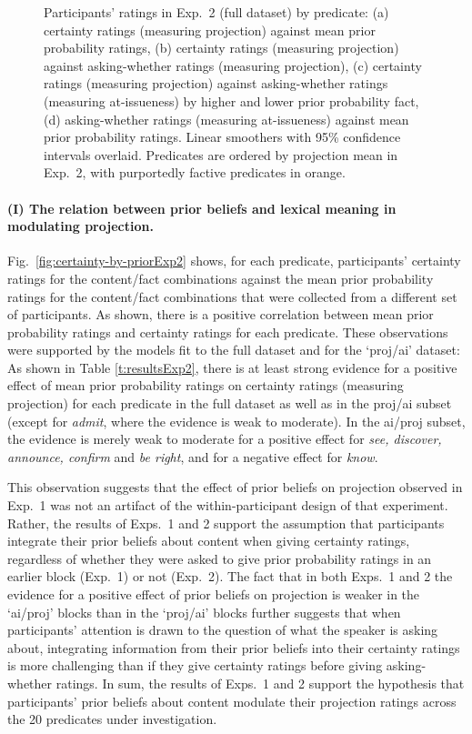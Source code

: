 \documentclass[11pt,fleqn]{article}
\newcommand{\6}{\mbox{$[\hspace*{-.6mm}[$}}
\newcommand{\9}{\mbox{$]\hspace*{-.6mm}]$}}
\begin{document}
\begin{figure}[h!]
\caption{Participants' ratings in Exp.~2 (full dataset) by predicate: (a) certainty ratings (measuring projection) against mean prior probability ratings, (b) certainty ratings (measuring projection) against asking-whether ratings (measuring projection), (c) certainty ratings (measuring projection) against asking-whether ratings (measuring at-issueness) by higher and lower prior probability fact, (d) asking-whether ratings (measuring at-issueness) against mean prior probability ratings. Linear smoothers with 95\% confidence intervals overlaid. Predicates are ordered by projection mean in Exp.~2, with purportedly factive predicates in orange.}\label{fig:results2}
\end{figure}

\paragraph{(I) The relation between prior beliefs and lexical meaning in modulating projection.}  Fig.~\ref{fig:certainty-by-priorExp2} shows, for each predicate, participants' certainty ratings for the content/fact combinations against the mean prior probability ratings for the content/fact combinations that were collected from a different set of participants. As shown, there is a positive correlation between mean prior probability ratings and certainty ratings for each predicate. These observations were supported by the models fit to the full dataset and for the `proj/ai' dataset: As shown in Table \ref{t:resultsExp2}, there is at least strong evidence for a positive effect of mean prior probability ratings on certainty ratings (measuring projection) for each predicate in the full dataset as well as in the proj/ai subset (except for {\em admit}, where the evidence is weak to moderate). In the ai/proj subset, the evidence is merely weak to moderate for a positive effect for {\em see, discover, announce, confirm} and {\em be right}, and for a negative effect for {\em know}. 

 This observation suggests that the effect of prior beliefs on projection observed in Exp.~1 was not an artifact of the within-participant design of that experiment. Rather, the results of Exps.~1 and 2 support the assumption that participants integrate their prior beliefs about content when giving certainty ratings, regardless of whether they were asked to give prior probability ratings in an earlier block (Exp.~1) or not (Exp.~2). The fact that in both Exps.~1 and 2 the evidence for a positive effect of prior beliefs on projection is weaker in the `ai/proj' blocks than in the `proj/ai' blocks further suggests that when participants' attention is drawn to the question of what the speaker is asking about, integrating information from their prior beliefs into their certainty ratings is more challenging than if they give certainty ratings before giving asking-whether ratings. In sum, the results of Exps.~1 and 2 support the hypothesis that participants' prior beliefs about content modulate their projection ratings across the 20 predicates under investigation.
\end{document}
